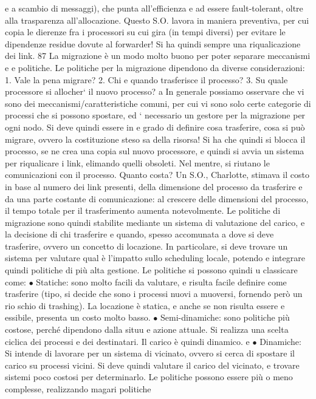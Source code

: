 \documentclass[a4paper,12pt]{article}
\begin{document}
e
a scambio di messaggi), che punta all'efficienza e ad essere fault-tolerant, oltre
alla trasparenza all'allocazione. Questo S.O. lavora in maniera preventiva, per
cui copia le dierenze fra i processori su cui gira (in tempi diversi) per evitare
le dipendenze residue dovute al forwarder! Si ha quindi sempre una riqualicazione dei link.
87
La migrazione è un modo molto buono per poter separare meccanismi e
e
politiche. Le politiche per la migrazione dipendono da diverse considerazioni:
1. Vale la pena migrare?
2. Chi e quando trasferisce il processo?
3. Su quale processore si allocher` il nuovo processo?
a
In generale possiamo osservare che vi sono dei meccanismi/caratteristiche comuni, per cui vi sono solo certe categorie
di processi che si possono spostare, ed
` necessario un gestore per la migrazione per ogni nodo. Si deve quindi essere in
e
grado di definire cosa trasferire, cosa si può migrare, ovvero la costituzione steso
sa della risorsa! Si ha che quindi si blocca il processo, se ne crea una copia sul
nuovo processore, e quindi si avvia un sistema per riqualicare i link, elimando
quelli obsoleti. Nel mentre, si riutano le comunicazioni con il processo.
Quanto costa? Un S.O., Charlotte, stimava il costo in base al numero dei
link presenti, della dimensione del processo da trasferire e da una parte costante
di comunicazione: al crescere delle dimensioni del processo, il tempo totale per
il trasferimento aumenta notevolmente.
Le politiche di migrazione sono quindi stabilite mediante un sistema di valutazione del carico, e la decisione di chi
trasferire e quando, spesso accomunata
a dove si deve trasferire, ovvero un concetto di locazione. In particolare, si deve
trovare un sistema per valutare qual è l'impatto sullo scheduling locale, potendo
e
integrare quindi politiche di più alta gestione. Le politiche si possono quindi
u
classicare come:
$\bullet$ Statiche: sono molto facili da valutare, e risulta facile definire come trasferire
(tipo, si decide che sono i processi nuovi a muoversi, fornendo però un rio
schio di trashing). La locazione è statica, e anche se non risulta essere
e
essibile, presenta un costo molto basso.
$\bullet$ Semi-dinamiche: sono politiche più costose, perché dipendono dalla situu
e
azione attuale. Si realizza una scelta ciclica dei processi e dei destinatari.
Il carico è quindi dinamico.
e
$\bullet$ Dinamiche: Si intende di lavorare per un sistema di vicinato, ovvero si
cerca di spostare il carico su processi vicini. Si deve quindi valutare il
carico del vicinato, e trovare sistemi poco costosi per determinarlo.
Le politiche possono essere più o meno complesse, realizzando magari politiche
\end{document}
